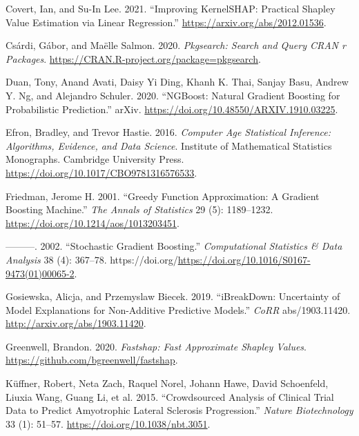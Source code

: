 \begin{CSLReferences}{1}{0}
\leavevmode{}%
Covert, Ian, and Su-In Lee. 2021. {``Improving KernelSHAP: Practical Shapley Value Estimation via Linear Regression.''} \url{https://arxiv.org/abs/2012.01536}.

\leavevmode{}%
Csárdi, Gábor, and Maëlle Salmon. 2020. \emph{Pkgsearch: Search and Query CRAN r Packages}. \url{https://CRAN.R-project.org/package=pkgsearch}.

\leavevmode{}%
Duan, Tony, Anand Avati, Daisy Yi Ding, Khanh K. Thai, Sanjay Basu, Andrew Y. Ng, and Alejandro Schuler. 2020. {``NGBoost: Natural Gradient Boosting for Probabilistic Prediction.''} arXiv. \url{https://doi.org/10.48550/ARXIV.1910.03225}.

\leavevmode{}%
Efron, Bradley, and Trevor Hastie. 2016. \emph{Computer Age Statistical Inference: Algorithms, Evidence, and Data Science}. Institute of Mathematical Statistics Monographs. Cambridge University Press. \url{https://doi.org/10.1017/CBO9781316576533}.

\leavevmode{}%
Friedman, Jerome H. 2001. {``Greedy Function Approximation: A Gradient Boosting Machine.''} \emph{The Annals of Statistics} 29 (5): 1189--1232. \url{https://doi.org/10.1214/aos/1013203451}.

\leavevmode{}%
---------. 2002. {``Stochastic Gradient Boosting.''} \emph{Computational Statistics \& Data Analysis} 38 (4): 367--78. https://doi.org/\url{https://doi.org/10.1016/S0167-9473(01)00065-2}.

\leavevmode{}%
Gosiewska, Alicja, and Przemyslaw Biecek. 2019. {``iBreakDown: Uncertainty of Model Explanations for Non-Additive Predictive Models.''} \emph{CoRR} abs/1903.11420. \url{http://arxiv.org/abs/1903.11420}.

\leavevmode{}%
Greenwell, Brandon. 2020. \emph{Fastshap: Fast Approximate Shapley Values}. \url{https://github.com/bgreenwell/fastshap}.

\leavevmode{}%
Küffner, Robert, Neta Zach, Raquel Norel, Johann Hawe, David Schoenfeld, Liuxia Wang, Guang Li, et al. 2015. {``Crowdsourced Analysis of Clinical Trial Data to Predict Amyotrophic Lateral Sclerosis Progression.''} \emph{Nature Biotechnology} 33 (1): 51--57. \url{https://doi.org/10.1038/nbt.3051}.


\end{CSLReferences}
